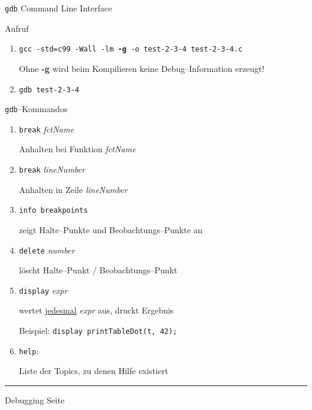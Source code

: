 
\begin{slide}{}
\normalsize

\begin{center}
\texttt{gdb} Command Line Interface
\end{center}
\vspace*{0.5cm}

\footnotesize
Aufruf
\begin{enumerate}
\item \texttt{gcc -std=c99 -Wall -lm {\bf -g} -o test-2-3-4 test-2-3-4.c}

      Ohne {\bf -g} wird beim Kompilieren keine Debug--Information erzeugt!
\item \texttt{gdb test-2-3-4}
\end{enumerate}

\texttt{gdb}--Kommandos
\begin{enumerate}
\item \texttt{break} \textsl{fctName}

       Anhalten bei Funktion \textsl{fctName}
\item \texttt{break} \textsl{lineNumber}

       Anhalten in Zeile \textsl{lineNumber}
\item \texttt{info breakpoints}

       zeigt Halte--Punkte und Beobachtungs--Punkte an
\item \texttt{delete} \textsl{number}

       l\"oscht  Halte--Punkt / Beobachtungs--Punkt

\item \texttt{display} \textsl{expr}

       wertet \underline{jedesmal} \textsl{expr} aus, druckt Ergebnis

       Beispiel: \texttt{display printTableDot(t, 42);}
\item \texttt{help}: 

       Liste der Topics, zu denen Hilfe existiert
\end{enumerate}

\vspace*{\fill}
\tiny \addtocounter{mypage}{1}
\rule{17cm}{1mm}
Debugging  \hspace*{\fill} Seite 
\end{slide}


